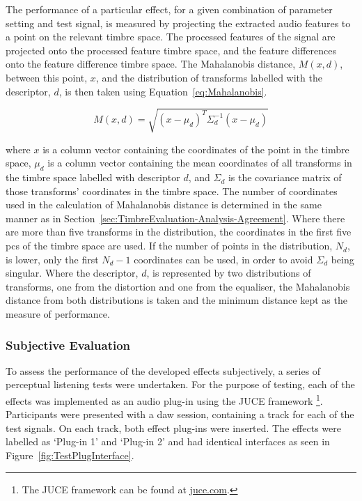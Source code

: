 			The performance of a particular effect, for a given combination of parameter setting and test
			signal, is measured by projecting the extracted audio features to a point on the relevant timbre
			space. The processed features of the signal are projected onto the processed feature timbre space,
			and the feature differences onto the feature difference timbre space. The Mahalanobis distance,
			$M(x, d)$, between this point, $x$, and the distribution of transforms labelled with the
			descriptor, $d$, is then taken using Equation~\ref{eq:Mahalanobis}.
			
			\begin{equation}
				M(x, d) = \sqrt{(x - \mu_{d})^{T}\Sigma_{d}^{-1}(x - \mu_{d})}
				\label{eq:Mahalanobis}
			\end{equation}

			where $x$ is a column vector containing the coordinates of the point in the timbre space, $\mu_{d}$
			is a column vector containing the mean coordinates of all transforms in the timbre space labelled
			with descriptor $d$, and $\Sigma_{d}$ is the covariance matrix of those transforms' coordinates in
			the timbre space. The number of coordinates used in the calculation of Mahalanobis distance is
			determined in the same manner as in Section~\ref{sec:TimbreEvaluation-Analysis-Agreement}. Where
			there are more than five transforms in the distribution, the coordinates in the first five
			\acrshort{pc}s of the timbre space are used. If the number of points in the distribution,
			$N_{d}$, is lower, only the first $N_{d} - 1$ coordinates can be used, in order to avoid
			$\Sigma_{d}$ being singular. Where the descriptor, $d$, is represented by two distributions of
			transforms, one from the distortion and one from the equaliser, the Mahalanobis distance from both
			distributions is taken and the minimum distance kept as the measure of performance.
	
		\subsubsection*{Subjective Evaluation}
			To assess the performance of the developed effects subjectively, a series of perceptual listening
			tests were undertaken. For the purpose of testing, each of the effects was implemented as an audio
			plug-in using the JUCE framework \footnote{The JUCE framework can be found at
			\href{https://juce.com}{juce.com}.}. Participants were presented with a \acrshort{daw} session,
			containing a track for each of the test signals. On each track, both effect plug-ins were inserted.
			The effects were labelled as `Plug-in 1' and `Plug-in 2' and had identical interfaces as seen
			in Figure~\ref{fig:TestPlugInterface}.

